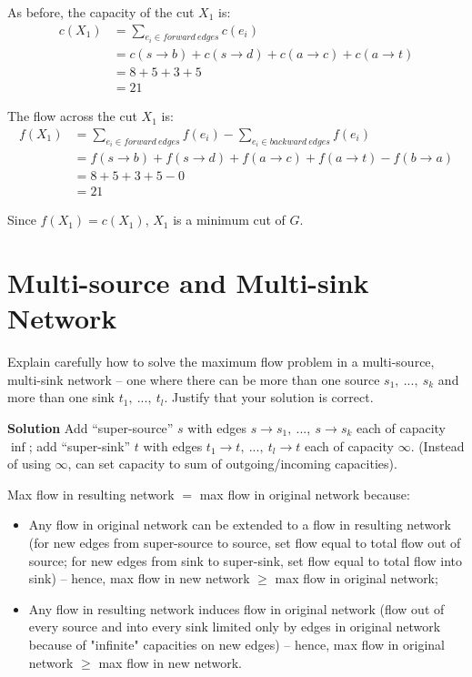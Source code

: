 \documentclass{article}
\begin{document}
As before, the capacity of the cut $X_1$ is:
\begin{equation}
	\begin{split}
		c(X_1) &= \sum_{e_i \in forward~edges} c(e_i)\\
		&=c(s \rightarrow b) + c(s \rightarrow d) + 
		c(a\rightarrow c) + c(a \rightarrow t)\\
		&= 8 + 5 + 3 + 5 \\
		&= 21
	\end{split}
\end{equation}

The flow across the cut $X_1$ is:
\begin{equation}
	\begin{split}
		f(X_1) &= \sum_{e_i \in forward~edges} f(e_i)
		- \sum_{e_i \in backward~edges} f(e_i)\\
		&= f(s \rightarrow b) + f(s \rightarrow d) + 
		f(a \rightarrow c) + f(a\rightarrow t) - f(b \rightarrow a)\\
		&=8 + 5 + 3 + 5 -0\\
		&= 21
	\end{split}
\end{equation}

Since $f(X_1) = c(X_1)$, $X_1$ is a minimum cut of $G$.

\section{Multi-source and Multi-sink Network}
Explain carefully how to solve the maximum flow problem in a
multi-source, multi-sink network -- one where there can be more than one
source $s_1,~...,~s_k$ and more than one sink $t_1,~...,~t_l$. Justify that your
solution is correct.

{\bf Solution} 
Add ``super-source'' $s$ with edges $s \rightarrow s_1,~...,~s\rightarrow s_k$
each of capacity $\inf$; add ``super-sink'' $t$ with edges 
$t_1 \rightarrow t,~...,~ t_l \rightarrow t$ each of capacity $\infty$. 
(Instead of using $\infty$, can set capacity to sum of outgoing/incoming
capacities).

Max flow in resulting network $=$ max flow in original network because:
\begin{itemize}
\item Any flow in original network can be extended to a flow in resulting
network (for new edges from super-source to source, set flow equal to
total flow out of source; for new edges from sink to super-sink, set
flow equal to total flow into sink) -- hence, max flow in new network
$\ge$ max flow in original network;
\item Any flow in resulting network induces flow in original network (flow
out of every source and into every sink limited only by edges in
original network because of "infinite" capacities on new edges) -- 
hence, max flow in original network $\ge$ max flow in new network.
\end{itemize}
\end{document}
